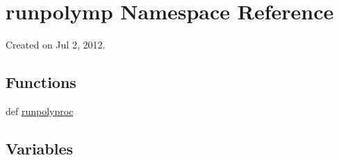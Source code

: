 \hypertarget{namespacerunpolymp}{
\section{runpolymp Namespace Reference}
\label{namespacerunpolymp}
}


Created on Jul 2, 2012.  


\subsection*{Functions}
\begin{DoxyCompactItemize}
\item 
def \hyperlink{namespacerunpolymp_a387348680cd8eda0fa0653674010f752}{runpolyproc}
\end{DoxyCompactItemize}
\subsection*{Variables}

